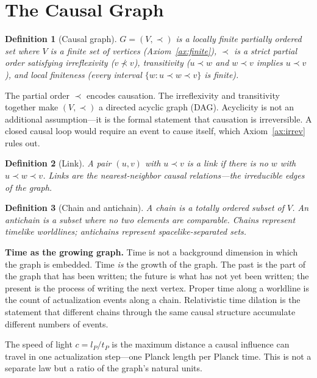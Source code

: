 \documentclass[11pt]{article}
\newtheorem{definition}{Definition}
\begin{document}
\section{The Causal Graph}
\label{sec:graph}

\begin{definition}[Causal graph]
$G=(V,\prec)$ is a locally finite partially ordered set where $V$ is a finite set of vertices (Axiom~\ref{ax:finite}), $\prec$ is a strict partial order satisfying irreflexivity ($v\not\prec v$), transitivity ($u\prec w$ and $w\prec v$ implies $u\prec v$), and local finiteness (every interval $\{w:u\prec w\prec v\}$ is finite).
\end{definition}

The partial order $\prec$ encodes causation. The irreflexivity and transitivity together make $(V,\prec)$ a directed acyclic graph (DAG). Acyclicity is not an additional assumption---it is the formal statement that causation is irreversible. A closed causal loop would require an event to cause itself, which Axiom~\ref{ax:irrev} rules out.

\begin{definition}[Link]
A pair $(u,v)$ with $u\prec v$ is a \emph{link} if there is no $w$ with $u\prec w\prec v$. Links are the nearest-neighbor causal relations---the irreducible edges of the graph.
\end{definition}

\begin{definition}[Chain and antichain]
A \emph{chain} is a totally ordered subset of $V$. An \emph{antichain} is a subset where no two elements are comparable. Chains represent timelike worldlines; antichains represent spacelike-separated sets.
\end{definition}

\textbf{Time as the growing graph.} Time is not a background dimension in which the graph is embedded. Time \emph{is} the growth of the graph. The past is the part of the graph that has been written; the future is what has not yet been written; the present is the process of writing the next vertex. Proper time along a worldline is the count of actualization events along a chain. Relativistic time dilation is the statement that different chains through the same causal structure accumulate different numbers of events.

The speed of light $c=l_P/t_P$ is the maximum distance a causal influence can travel in one actualization step---one Planck length per Planck time. This is not a separate law but a ratio of the graph's natural units.
\end{document}
